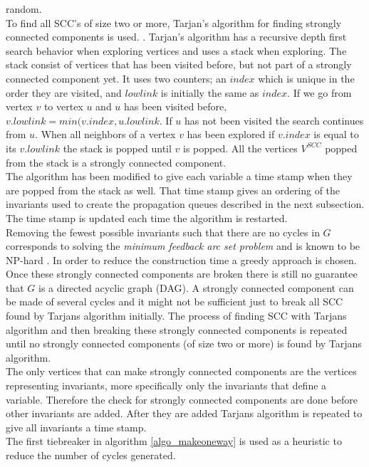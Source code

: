 random.
\\  
To find all SCC's of size two or more, Tarjan's algorithm for finding strongly connected components is used. 
. Tarjan's algorithm has a recursive depth first search behavior when exploring 
vertices and uses a stack when exploring. The stack consist of vertices that has been visited before, but not part of a 
strongly connected component yet. It uses two counters; an $index$ which is unique in the order they are visited, and 
$lowlink$ is initially the same as $index$. If we go from vertex $v$ to vertex $u$ and $u$ has been visited 
before, $v.lowlink = min(v.index,u.lowlink$. If $u$ has not been visited the search continues from $u$. When all 
neighbors of a vertex $v$ has been explored if $v.index$ is equal to its $v.lowlink$ the stack is popped until $v$ is 
popped. All the vertices $V^{SCC}$ popped from the stack is a strongly connected component. \\
The algorithm has been modified to give each variable a time stamp when they are popped from the stack as well. That 
time stamp gives an ordering of the invariants used to create the propagation queues described in the next subsection. 
The time stamp is updated each time the algorithm is restarted. \\
Removing the fewest possible invariants such that there are no cycles in $G$ corresponds to solving the \emph{minimum 
feedback arc set problem} and is known to be NP-hard \cite[p.9]{oscar}. In order to reduce the construction time a 
greedy approach is chosen. \\
Once these strongly connected components are broken there is still no guarantee that $G$ is a directed acyclic graph 
(DAG). A strongly connected component can be made of several cycles and it might not be sufficient just to break all 
SCC found by Tarjans algorithm initially. The process of finding SCC with Tarjans algorithm and then 
breaking these strongly connected components is repeated until no strongly connected components (of size two or more) 
is found by Tarjans algorithm. \medskip \\  
The only vertices that can make strongly connected components are the vertices representing invariants, more 
specifically only the invariants that define a variable. Therefore the check for strongly connected components are done 
before other invariants are added. After they are added Tarjans algorithm is repeated to give all invariants a 
time stamp. \\ 
The first tiebreaker in algorithm \ref{algo_makeoneway} is used as a heuristic to reduce the number of cycles 
generated.  \\





